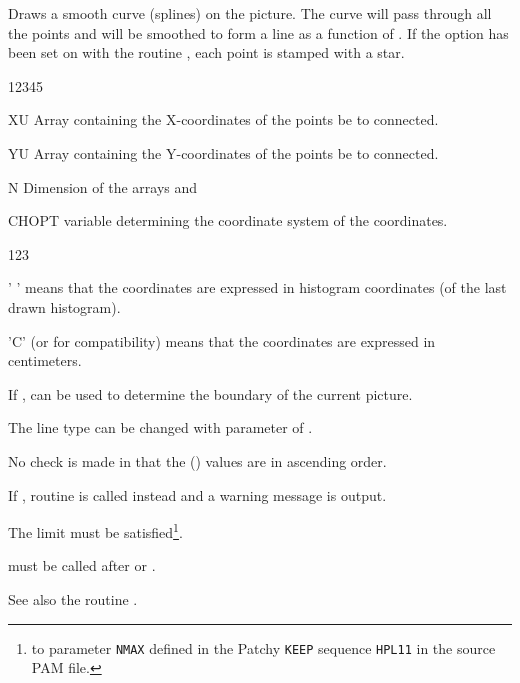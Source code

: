 \Action
Draws a smooth curve (splines) on the picture. The curve will pass through all
the points and will be smoothed to form a line as a function of . If
the option  has been set on with the routine , each
point  is stamped with a star.
\Pdesc
\begin{DLtt}{12345}
\item[XU]    Array containing the X-coordinates of the points be to connected.
\item[YU]    Array containing the Y-coordinates of the points be to connected.
\item[N]     Dimension of the arrays  and 
\item[CHOPT] \CHARACTER{} variable determining the coordinate system of the
              coordinates.
\begin{DLtt}{123}
   \item[' '] means that the coordinates are expressed in histogram coordinates
              (of the last drawn histogram).
   \item['C'] (or  for compatibility) means that the coordinates are
              expressed in centimeters.
\end{DLtt}
\end{DLtt}
\Remarks
\begin{UL}
\item If ,  can be used to determine the boundary
      of the current picture.
\item The line type can be changed with parameter  of .
\item No check is made in  that the  () values are
      in ascending order.
\item If , routine  is called instead and a warning
      message is output.
\item The limit  must be satisfied\footnote{%
      to parameter {\tt NMAX} defined in the Patchy {\tt KEEP} sequence
      {\tt HPL11} in the \HPLOT{} source PAM file.}.
\item {} must be called after  or .
\item See also the \HIGZ{} routine .
\end{UL}


